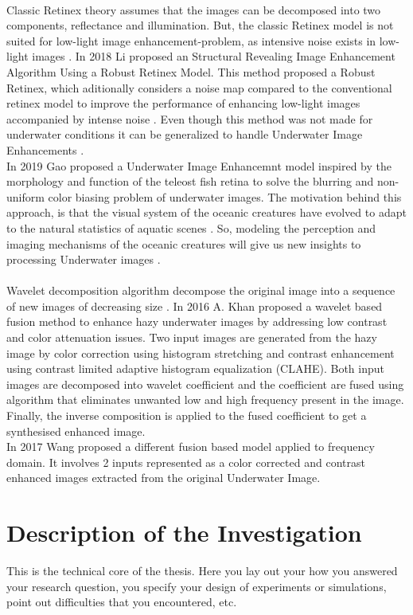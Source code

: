 \documentclass[a4paper,11pt,oneside]{article}
\begin{document}
  \\
  Classic Retinex theory assumes that the images can be decomposed into two components, reflectance and illumination. But, the classic Retinex model is not suited for low-light image enhancement-problem, as intensive noise exists in low-light images \cite{5}. In 2018 Li \cite{5} proposed an Structural Revealing Image Enhancement Algorithm Using a Robust Retinex Model. This method proposed a Robust Retinex, which aditionally considers a noise map compared to the conventional retinex model to improve the performance of enhancing low-light images accompanied by intense noise \cite{5}. Even though this method was not made for underwater conditions it can be generalized to handle Underwater Image Enhancements \cite{5}.\\
  In 2019 Gao \cite{6} proposed a Underwater Image Enhancemnt model inspired by the morphology and function of the teleost fish retina to solve the blurring and non-uniform color biasing problem of underwater images. The motivation behind this approach, is that the visual system of the oceanic creatures have evolved to adapt to the natural statistics of aquatic scenes \cite{6}. So, modeling the perception and imaging mechanisms of the oceanic creatures will give us new insights to processing Underwater images \cite{6}.\\
  \\
  Wavelet decomposition algorithm decompose the original image into a sequence of new images of decreasing size \cite{24}. In 2016 A. Khan \cite{9} proposed a wavelet based fusion method to enhance hazy underwater images by addressing low contrast and color attenuation issues. Two input images are generated from the hazy image by color correction using histogram stretching and contrast enhancement using contrast limited adaptive histogram equalization (CLAHE). Both input images are decomposed into wavelet coefficient and the coefficient are fused using algorithm that eliminates unwanted low and high frequency present in the image. Finally, the inverse composition is applied to the fused coefficient to get a synthesised enhanced image. \cite{9}\\
  In 2017 Wang \cite{12} proposed a different fusion based model applied to frequency domain. It involves 2 inputs represented as a color corrected and contrast enhanced images extracted from the original Underwater Image.  
  
  \section{Description of the Investigation}
  \label{sec:3}
  This is the technical core of the thesis. Here you lay out your how
  you answered your research question, you specify your design of
  experiments or simulations, point out difficulties that you
  encountered, etc.
\end{document}
